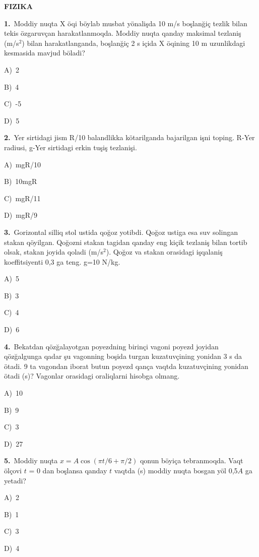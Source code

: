 \documentclass[11pt,a4paper]{article}
\newcommand{\opt}[2]{\hspace*{4mm}#1)\ #2\par}
\begin{document}
\begin{center}{\Large\textbf{FIZIKA}}\end{center}
\noindent\begin{minipage}{\linewidth}
\textbf{1.}\ Moddiy nuqta X öqi böylab musbat yönalişda 10 m/s boşlanğiç tezlik bilan tekis özgaruvçan harakatlanmoqda. Moddiy nuqta qanday maksimal tezlaniş (m/s$^{2}$) bilan harakatlanganda, boşlanğiç 2 s içida X öqining 10 m uzunlikdagi kesmasida mavjud böladi?\par\smallskip
\opt{A}{2}
\opt{B}{4}
\opt{C}{-5}
\opt{D}{5}
\end{minipage}\vspace{9pt}\par
\noindent\begin{minipage}{\linewidth}
\textbf{2.}\ Yer sirtidagi jism R/10 balandlikka kötarilganda bajarilgan işni toping. R-Yer radiusi, g-Yer sirtidagi erkin tuşiş tezlanişi.\par\smallskip
\opt{A}{mgR/10}
\opt{B}{10mgR}
\opt{C}{mgR/11}
\opt{D}{mgR/9}
\end{minipage}\vspace{9pt}\par
\noindent\begin{minipage}{\linewidth}
\textbf{3.}\ Gorizontal silliq stol ustida qoğoz yotibdi. Qoğoz ustiga esa suv solingan stakan qöyilgan. Qoğozni stakan tagidan qanday eng kiçik tezlaniş bilan tortib olsak, stakan joyida qoladi (m/s$^{2}$). Qoğoz va stakan orasidagi işqalaniş koeffitsiyenti 0,3 ga teng. g=10 N/kg.\par\smallskip
\opt{A}{5}
\opt{B}{3}
\opt{C}{4}
\opt{D}{6}
\end{minipage}\vspace{9pt}\par
\noindent\begin{minipage}{\linewidth}
\textbf{4.}\ Bekatdan qözğalayotgan poyezdning birinçi vagoni poyezd joyidan qözğalgunga qadar şu vagonning boşida turgan kuzatuvçining yonidan 3 s da ötadi. 9 ta vagondan iborat butun poyezd qança vaqtda kuzatuvçining yonidan ötadi (s)? Vagonlar orasidagi oraliqlarni hisobga olmang.\par\smallskip
\opt{A}{10}
\opt{B}{9}
\opt{C}{3}
\opt{D}{27}
\end{minipage}\vspace{9pt}\par
\noindent\begin{minipage}{\linewidth}
\textbf{5.}\ Moddiy nuqta $x = A\cos(\pi t/6 + \pi/2)$ qonun böyiça tebranmoqda. Vaqt ölçovi $t$ = 0 dan boşlansa qanday $t$ vaqtda (s) moddiy nuqta bosgan yöl 0,5$A$ ga yetadi?\par\smallskip
\opt{A}{2}
\opt{B}{1}
\opt{C}{3}
\opt{D}{4}
\end{minipage}\vspace{9pt}\par
\end{document}
